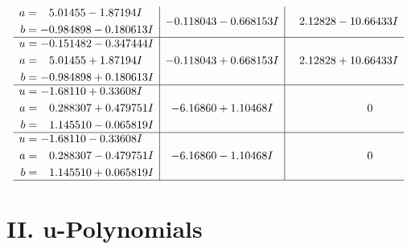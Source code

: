 \documentclass[1p]{elsarticle_modified}
\theoremstyle{definition}
\begin{document}
$$\begin{array}{c|c|c}
\begin{aligned}
a &= \phantom{-}5.01455 - 1.87194 I \\
b &= -0.984898 - 0.180613 I\end{aligned}
 & -0.118043 - 0.668153 I & \phantom{-}2.12828 - 10.66433 I \\ \hline\begin{aligned}
u &= -0.151482 - 0.347444 I \\
a &= \phantom{-}5.01455 + 1.87194 I \\
b &= -0.984898 + 0.180613 I\end{aligned}
 & -0.118043 + 0.668153 I & \phantom{-}2.12828 + 10.66433 I \\ \hline\begin{aligned}
u &= -1.68110 + 0.33608 I \\
a &= \phantom{-}0.288307 + 0.479751 I \\
b &= \phantom{-}1.145510 - 0.065819 I\end{aligned}
 & -6.16860 + 1.10468 I & \phantom{-0.000000 } 0 \\ \hline\begin{aligned}
u &= -1.68110 - 0.33608 I \\
a &= \phantom{-}0.288307 - 0.479751 I \\
b &= \phantom{-}1.145510 + 0.065819 I\end{aligned}
 & -6.16860 - 1.10468 I & \phantom{-0.000000 } 0\\
 \hline 
 \end{array}$$\newpage
\newpage\renewcommand{\arraystretch}{1}
\centering \section*{ II. u-Polynomials}
\end{document}
